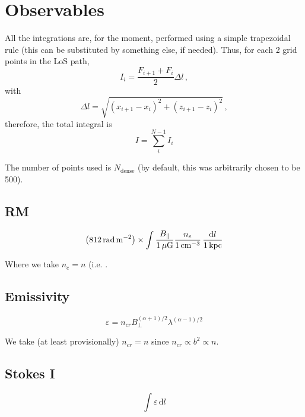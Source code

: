 \documentclass[a4paper,10pt]{article}
\newcommand{\dd}{\mathrm{d}}  %
\newcommand{\kpc}{\,\text{kpc}}  %
\newcommand{\muG}{\,\mu{\rm G}}  %
\newcommand{\cm}{\,{\rm cm}}
\begin{document}
\section{Observables}

All the integrations are, for the moment, performed using a simple trapezoidal rule
(this can be substituted by something else, if needed).
Thus, for each 2 grid points in the LoS path,
\begin{equation}
 I_i = \frac{F_{i+1}+F_{i}}{2} \Delta l\,,
\end{equation}
with
\begin{equation}
    \Delta l = \sqrt{ (x_{i+1}-x_i)^2 + (z_{i+1}-z_i)^2}\,,
\end{equation}
therefore, the total integral is
\begin{equation}
 I = \sum_{i}^{N-1} I_i
\end{equation}

The number of points used is $N_\text{dense}$ (by default, this was arbitrarily chosen
to be 500).




\subsection{RM}
\begin{equation}
    \left(812 \,\text{rad\,m}^{-2}\right) \times  \int{ \frac{B_\parallel}{1 \muG} \frac{n_e}{1 \cm^{-3}} \,\frac{\dd l}{1\kpc}}
\end{equation}

Where we take $n_e=n$ (i.e. .
\subsection{Emissivity}

\begin{equation}
 \varepsilon = n_{cr} B_\perp^{(\alpha+1)/2}\lambda^{(\alpha-1)/2}
\end{equation}

We take (at least provisionally) $n_{cr} = n$ since $n_{cr}\propto b^2 \propto n$.

\subsection{Stokes I}
\begin{equation}
    \int \varepsilon  \,\dd l
\end{equation}
\end{document}
